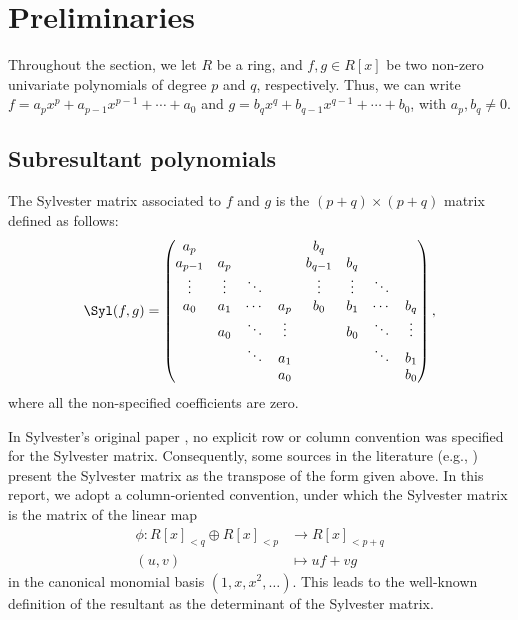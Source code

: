 \section{Preliminaries}

Throughout the section, we let $R$ be a ring, and $f,g\in R[x]$ be two non-zero univariate polynomials of degree $p$ and $q$, respectively. Thus, we can write $f=a_p x^p + a_{p-1} x^{p-1} + \cdots + a_0$ and $g=b_q x^q + b_{q-1} x^{q-1} + \cdots + b_0$, with $a_p, b_q \neq 0$.

\subsection{Subresultant polynomials}

\begin{definition}
    The Sylvester matrix associated to $f$ and $g$ is the $(p+q)\times(p+q)$ matrix defined as follows:
    \begin{equation*}
        \Syl(f,g)=
        \begin{pmatrix}
            a_p     &        &        &        & b_q     &        &        &        \\
            a_{p-1} & a_p    &        &        & b_{q-1} & b_q    &        &        \\
            \vdots  & \vdots & \ddots &        & \vdots  & \vdots & \ddots &        \\
            a_0     & a_1    & \cdots & a_p    & b_0     & b_1    & \cdots & b_q    \\
                    & a_0    & \ddots & \vdots &         & b_0    & \ddots & \vdots \\
                    &        & \ddots & a_1    &         &        & \ddots & b_1    \\
                    &        &        & a_0    &         &        &        & b_0
        \end{pmatrix},
    \end{equation*}
    where all the non-specified coefficients are zero.
\end{definition}

In Sylvester's original paper \cite{sylvester1853xviii}, no explicit row or column convention was specified for the Sylvester matrix. Consequently, some sources in the literature (e.g., \cite{basu2006algorithms}) present the Sylvester matrix as the transpose of the form given above. In this report, we adopt a column-oriented convention, under which the Sylvester matrix is the matrix of the linear map
\begin{align*}
    \phi : R[x]_{<q} \oplus R[x]_{<p} & \to R[x]_{<p+q} \\
    (u,v)                             & \mapsto uf + vg
\end{align*}
in the canonical monomial basis $(1,x,x^2,\ldots)$. This leads to the well-known definition of the resultant as the determinant of the Sylvester matrix.

